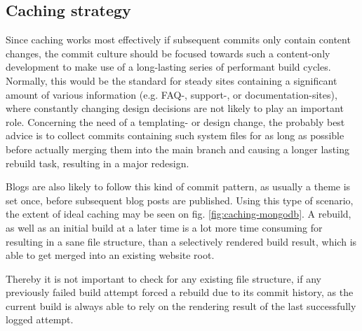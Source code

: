 \subsection{Caching strategy}
Since caching works most effectively if subsequent commits only contain content changes, the commit culture should be focused towards such a content-only development to make use of a long-lasting series of performant build cycles. Normally, this would be the standard for steady sites containing a significant amount of various information (e.g. FAQ-, support-, or documentation-sites), where constantly changing design decisions are not likely to play an important role. Concerning the need of a templating- or design change, the probably best advice is to collect commits containing such system files for as long as possible before actually merging them into the main branch and causing a longer lasting rebuild task, resulting in a major redesign.

Blogs are also likely to follow this kind of commit pattern, as usually a theme is set once, before subsequent blog posts are published. Using this type of scenario, the extent of ideal caching may be seen on fig. \ref{fig:caching-mongodb}. A rebuild, as well as an initial build at a later time is a lot more time consuming for resulting in a sane file structure, than a selectively rendered build result, which is able to get merged into an existing website root.

Thereby it is not important to check for any existing file structure, if any previously failed build attempt forced a rebuild due to its commit history, as the current build is always able to rely on the rendering result of the last successfully logged attempt.
